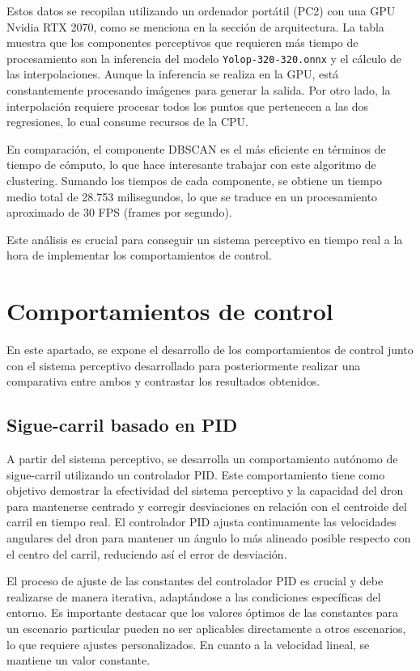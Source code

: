 Estos datos se recopilan utilizando un ordenador portátil (PC2) con una GPU Nvidia RTX 2070, como se menciona en la sección de arquitectura. La tabla muestra que los 
componentes perceptivos que requieren más tiempo de procesamiento son la inferencia del modelo \texttt{Yolop-320-320.onnx} y el cálculo de las interpolaciones. 
Aunque la inferencia se realiza en la GPU, está constantemente procesando imágenes para generar la salida. Por otro lado, la interpolación 
requiere procesar todos los puntos que pertenecen a las dos regresiones, lo cual consume recursos de la CPU.

En comparación, el componente DBSCAN es el más eficiente en términos de tiempo de cómputo, lo que hace interesante trabajar con este algoritmo de clustering. 
Sumando los tiempos de cada componente, se obtiene un tiempo medio total de 28.753 milisegundos, lo que se traduce en un procesamiento aproximado de 30 FPS (frames por segundo). 

Este análisis es crucial para conseguir un sistema perceptivo en tiempo real a la hora de implementar los comportamientos de control. 

  \section{Comportamientos de control}
  \label{sec:Control}

  En este apartado, se expone el desarrollo de los comportamientos de control junto con el sistema perceptivo desarrollado para posteriormente realizar 
  una comparativa entre ambos y contrastar los resultados obtenidos.

\subsection{Sigue-carril basado en PID}
\label{sec:Control-PID}

A partir del sistema perceptivo, se desarrolla un comportamiento autónomo de sigue-carril utilizando un controlador PID. Este comportamiento tiene como objetivo
demostrar la efectividad del sistema perceptivo y la capacidad del dron para mantenerse centrado y corregir desviaciones en relación
con el centroide del carril en tiempo real. El controlador PID ajusta continuamente las velocidades angulares del dron para mantener un ángulo lo más alineado posible respecto con el
centro del carril, reduciendo así el error de desviación.

El proceso de ajuste de las constantes del controlador PID es crucial y debe realizarse de manera iterativa, adaptándose a las condiciones específicas del entorno. Es importante
destacar que los valores óptimos de las constantes para un escenario particular pueden no ser aplicables directamente a otros escenarios, lo que requiere ajustes personalizados. 
En cuanto a la velocidad lineal, se mantiene un valor constante.\newline

